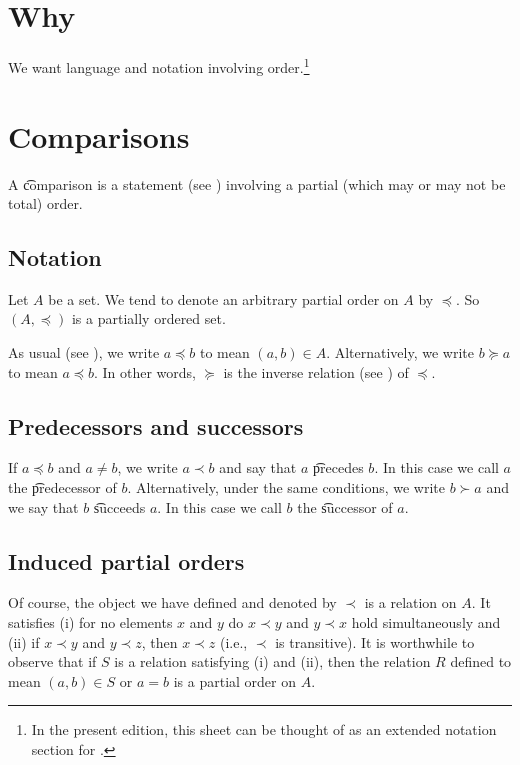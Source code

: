 

\section*{Why}

We want language and notation involving order.\footnote{In the present edition, this sheet can be thought of as an extended notation section for .}

\section*{Comparisons}

A \t{comparison} is a statement (see ) involving a partial (which may or may not be total) order.

\subsection*{Notation}

Let $A$ be a set.
We tend to denote an arbitrary partial order on $A$ by $\preceq$.
So $(A, \preceq)$ is a partially ordered set.

As usual (see ), we write $a \preceq b$ to mean $(a, b) \in A$.
Alternatively, we write $b \succeq a$ to mean $a \preceq b$.
In other words, $\succeq$ is the inverse relation (see ) of $\preceq$.

\subsection*{Predecessors and successors}

If $a \preceq b$ and $a \neq b$, we write $a \prec b$ and say that $a$ \t{precedes} $b$.
In this case we call $a$ the \t{predecessor} of $b$.
Alternatively, under the same conditions, we write $b \succ a$ and we say that $b$ \t{succeeds} $a$.
In this case we call $b$ the \t{successor} of $a$.

\subsection*{Induced partial orders}

Of course, the object we have defined and denoted by $\prec$ is a relation on $A$.
It satisfies (i) for no elements $x$ and $y$ do $x \prec y$ and $y \prec x$ hold simultaneously and (ii) if $x \prec y$ and $y \prec z$, then $x \prec z$ (i.e., $\prec$ is transitive).
It is worthwhile to observe that if $S$ is a relation satisfying (i) and (ii), then the relation $R$ defined to mean $(a, b) \in S$ or $a = b$ is a partial order on $A$.

